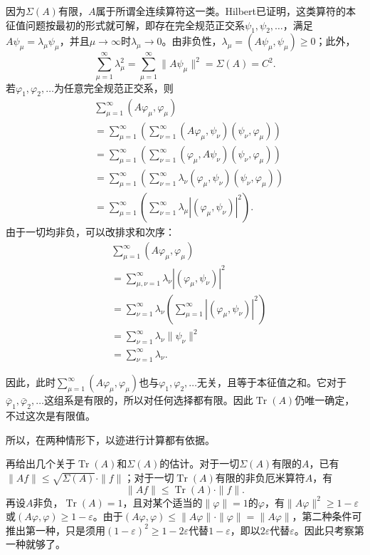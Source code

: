 \documentclass[fontsize=13pt,twoside,openany,headings=normal,parskip=false,bookmarkpackage=false,DIV=calc]{scrbook}
\begin{document}
因为$\Sigma(A)$有限，$A$属于所谓全连续算符这一类。Hilbert已证明，这类算符的本征值问题按最初的形式就可解，即存在完全规范正交系$\psi_1,\allowbreak \psi_2,\allowbreak \ldots$，满足$A\psi_\mu=\lambda_\mu\psi_\mu$，并且$\mu\to\infty$时$\lambda_\mu\to0$。由非负性，$\lambda_\mu=(A\psi_\mu,\allowbreak \psi_\mu)\geq0$；此外，
\[
\sum_{\mu=1}^{\infty}\lambda_\mu^2
=\sum_{\mu=1}^{\infty}\|A\psi_\mu\|^2=\Sigma(A)=C^2.
\]
若$\varphi_1,\allowbreak \varphi_2,\allowbreak \ldots$为任意完全规范正交系，则
\begin{align*}
&\sum_{\mu=1}^{\infty}(A\varphi_\mu,\varphi_\mu)\\
&=\sum_{\mu=1}^{\infty}\left(\sum_{\nu=1}^{\infty}
(A\varphi_\mu,\psi_\nu)(\psi_\nu,\varphi_\mu)\right)\\
&=\sum_{\mu=1}^{\infty}\left(\sum_{\nu=1}^{\infty}
(\varphi_\mu,A\psi_\nu)(\psi_\nu,\varphi_\mu)\right)\\
&=\sum_{\mu=1}^{\infty}\left(\sum_{\nu=1}^{\infty}
\lambda_\nu(\varphi_\mu,\psi_\nu)(\psi_\nu,\varphi_\mu)\right)\\
&=\sum_{\mu=1}^{\infty}\left(\sum_{\nu=1}^{\infty}
\lambda_\mu|(\varphi_\mu,\psi_\nu)|^2\right).
\end{align*}
由于一切均非负，可以改排求和次序：
\begin{align*}
&\sum_{\mu=1}^{\infty}(A\varphi_\mu,\varphi_\mu)\\
&=\sum_{\mu,\nu=1}^{\infty}\lambda_\nu|(\varphi_\mu,\psi_\nu)|^2\\
&=\sum_{\nu=1}^{\infty}\lambda_\nu
\left(\sum_{\mu=1}^{\infty}|(\varphi_\mu,\psi_\nu)|^2\right)\\
&=\sum_{\nu=1}^{\infty}\lambda_\nu\|\psi_\nu\|^2\\
&=\sum_{\nu=1}^{\infty}\lambda_\nu.
\end{align*}

\hypertarget{origpage-99}{}\label{origpage-99}因此，此时$\sum_{\mu=1}^{\infty}(A\varphi_\mu,\allowbreak \varphi_\mu)$也与$\varphi_1,\allowbreak \varphi_2,\allowbreak \ldots$无关，且等于本征值之和。它对于$\bar\varphi_1,\allowbreak \bar\varphi_2,\allowbreak \ldots$这组系是有限的，所以对任何选择都有限。因此$\operatorname{Tr}(A)$仍唯一确定，不过这次是有限值。

所以，在两种情形下，以迹进行计算都有依据。

再给出几个关于$\operatorname{Tr}(A)$和$\Sigma(A)$的估计。对于一切$\Sigma(A)$有限的$A$，已有$\|Af\|\leq\sqrt{\Sigma(A)}\cdot\|f\|$；对于一切$\operatorname{Tr}(A)$有限的非负厄米算符$A$，有
\[
\|Af\|\leq\operatorname{Tr}(A)\cdot\|f\|.
\]
再设$A$非负，$\operatorname{Tr}(A)=1$，且对某个适当的$\|\varphi\|=1$的$\varphi$，有$\|A\varphi\|^2\geq1-\varepsilon$或$(A\varphi,\allowbreak \varphi)\geq1-\varepsilon$。由于$(A\varphi,\allowbreak \varphi)\leq\|A\varphi\|\cdot\|\varphi\|=\|A\varphi\|$，第二种条件可推出第一种，只是须用$(1-\varepsilon)^2\geq1-2\varepsilon$代替$1-\varepsilon$，即以$2\varepsilon$代替$\varepsilon$。因此只考察第一种就够了。
\end{document}

